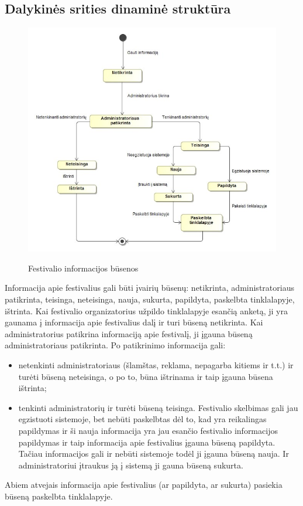 \documentclass{VUMIFPSkursinis}
\begin{document}
\subsection{Dalykinės srities dinaminė struktūra}
\begin{figure}[H]
    \centering
    \includegraphics[scale=0.7]{img/geri/Informacija_Busenos.jpg}
    \label{img:uml18}
	\caption{Festivalio informacijos būsenos}
\end{figure}
Informacija apie festivalius gali būti įvairių būsenų: netikrinta, administratoriaus patikrinta, teisinga, neteisinga, nauja, sukurta, papildyta, paskelbta tinklalapyje, ištrinta. Kai festivalio organizatorius užpildo tinklalapyje esančią anketą, ji yra gaunama į informacija apie festivalius dalį ir turi būseną netikrinta. Kai administratorius patikrina informaciją apie festivalį, ji įgauna būseną administratoriaus patikrinta. Po patikrinimo informacija gali:
\begin{itemize}
\item netenkinti administratoriaus (šlamštas, reklama, nepagarba kitiems ir t.t.) ir turėti būseną neteisinga, o po to, būna ištrinama ir taip įgauna būsena ištrinta;
\item tenkinti administratorių ir turėti būseną teisinga. Festivalio skelbimas gali jau egzistuoti sistemoje, bet nebūti paskelbtas dėl to, kad yra reikalingas papildymas ir ši nauja informacija yra jau esančio festivalio informacijos papildymas ir taip informacija apie festivalius įgauna būseną papildyta. Tačiau informacijos gali ir nebūti sistemoje todėl ji įgauna būseną nauja. Ir administratoriui įtraukus ją į sistemą ji gauna būseną sukurta. 
\end{itemize}
Abiem atvejais informacija apie festivalius (ar papildyta, ar sukurta) pasiekia būseną paskelbta tinklalapyje.
\end{document}
